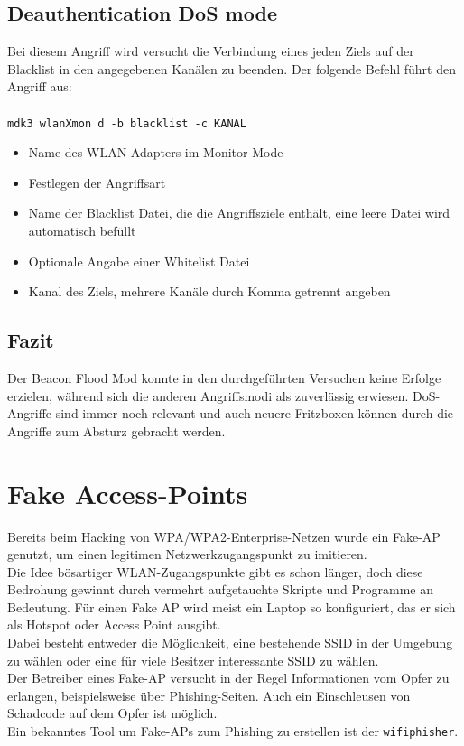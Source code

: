 \subsection{Deauthentication DoS mode}
Bei diesem Angriff wird versucht die Verbindung eines jeden Ziels auf der Blacklist in den angegebenen Kanälen zu beenden. Der folgende Befehl führt den Angriff aus: \\
\\
\colorbox{altgray}{\lstinline|mdk3 wlanXmon d -b blacklist -c KANAL|}
\begin{itemize}
	\item {} Name des WLAN-Adapters im Monitor Mode
	\item {} Festlegen der Angriffsart
	\item {} Name der Blacklist Datei, die die Angriffsziele enthält, eine leere Datei wird automatisch befüllt
	\item {} Optionale Angabe einer Whitelist Datei
	\item {} Kanal des Ziels, mehrere Kanäle durch Komma getrennt angeben
\end{itemize}


\subsection{Fazit}

Der Beacon Flood Mod konnte in den durchgeführten Versuchen keine Erfolge erzielen, während sich die anderen Angriffsmodi als zuverlässig erwiesen. DoS-Angriffe sind immer noch relevant und auch neuere Fritzboxen können durch die Angriffe zum Absturz gebracht werden.
\newpage

\section{Fake Access-Points}
Bereits beim Hacking von WPA/WPA2-Enterprise-Netzen wurde ein Fake-AP genutzt, um einen legitimen Netzwerkzugangspunkt zu imitieren.\\ Die Idee bösartiger WLAN-Zugangspunkte gibt es schon länger, doch diese Bedrohung gewinnt durch vermehrt aufgetauchte Skripte und Programme an Bedeutung. Für einen Fake AP wird meist ein Laptop so konfiguriert, das er sich als Hotspot oder Access Point ausgibt.\\ Dabei besteht entweder die Möglichkeit, eine bestehende SSID in der Umgebung zu wählen oder eine für viele Besitzer interessante SSID zu wählen. \\
Der Betreiber eines Fake-AP versucht in der Regel Informationen vom Opfer zu erlangen, beispielsweise über Phishing-Seiten. Auch ein Einschleusen von Schadcode auf dem Opfer ist möglich. \\
Ein bekanntes Tool um Fake-APs zum Phishing zu erstellen ist der \colorbox{altgray}{\lstinline|wifiphisher|}.

